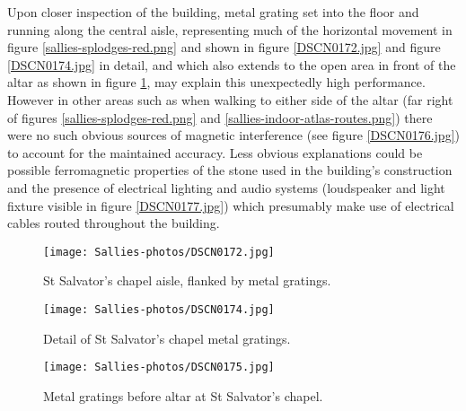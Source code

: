 Upon closer inspection of the building, metal grating set into the floor and running along the central aisle, representing much of the horizontal movement in figure \ref{sallies-splodges-red.png} and shown in figure \ref{DSCN0172.jpg} and figure \ref{DSCN0174.jpg} in detail, and which also extends to the open area in front of the altar as shown in figure \ref{DSCN0175.jpg}, may explain this unexpectedly high performance. However in other areas such as when walking to either side of the altar (far right of figures \ref{sallies-splodges-red.png} and \ref{sallies-indoor-atlas-routes.png}) there were no such obvious sources of magnetic interference (see figure \ref{DSCN0176.jpg}) to account for the maintained accuracy. Less obvious explanations could be possible ferromagnetic properties of the stone used in the building's construction and the presence of electrical lighting and audio systems (loudspeaker and light fixture visible in figure \ref{DSCN0177.jpg}) which presumably make use of electrical cables routed throughout the building.

\begin{figure}[h]
    \begin{center}
    \begin{minipage}{.32\textwidth}
        \begin{center}
        \texttt{[image: Sallies-photos/DSCN0172.jpg]}
        \caption{St Salvator's chapel aisle, flanked by metal gratings.}
        \label{DSCN0172.jpg}
        \end{center}
    \end{minipage}%
    \hspace{.01\textwidth}
    \begin{minipage}{.32\textwidth}
		\begin{center}
        \texttt{[image: Sallies-photos/DSCN0174.jpg]}
        \caption{Detail of St Salvator's chapel metal gratings.}
        \label{DSCN0174.jpg}
        \end{center}
    \end{minipage}%
    \hspace{.01\textwidth}
    \begin{minipage}{.32\textwidth}
        \begin{center}
        \texttt{[image: Sallies-photos/DSCN0175.jpg]}
        \caption{Metal gratings before altar at St Salvator's chapel.}
        \label{DSCN0175.jpg}
        \end{center}
    \end{minipage}
    \end{center}
\end{figure}

